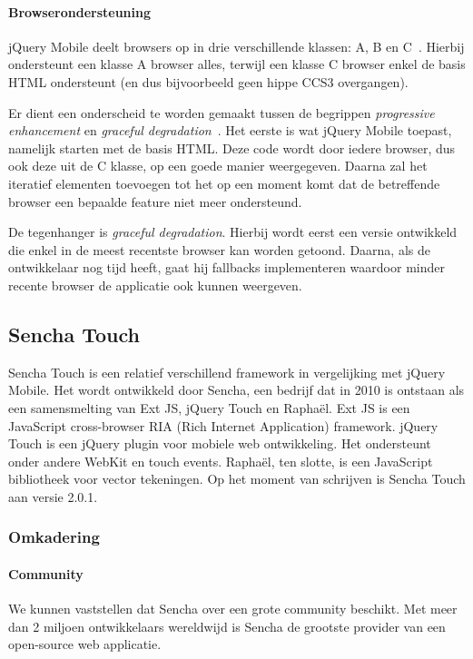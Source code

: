\paragraph{Browserondersteuning}
\label{sec:jqm-browser-support}
jQuery Mobile deelt browsers op in drie verschillende klassen: A, B en C~\cite{JQuery2012d}. Hierbij ondersteunt een klasse A browser alles, terwijl een klasse C browser enkel de basis HTML ondersteunt (en dus bijvoorbeeld geen hippe CCS3 overgangen).

Er dient een onderscheid te worden gemaakt tussen de begrippen \emph{progressive enhancement} en \emph{graceful degradation}~\cite{Hens2012}. Het eerste is wat jQuery Mobile toepast, namelijk starten met de basis HTML. Deze code wordt door iedere browser, dus ook deze uit de C klasse, op een goede manier weergegeven. Daarna zal het iteratief elementen toevoegen tot het op een moment komt dat de betreffende browser een bepaalde feature niet meer ondersteund.

De tegenhanger is \emph{graceful degradation}. Hierbij wordt eerst een versie ontwikkeld die enkel in de meest recentste browser kan worden getoond. Daarna, als de ontwikkelaar nog tijd heeft, gaat hij fallbacks implementeren waardoor minder recente browser de applicatie ook kunnen weergeven.


\subsection{Sencha Touch}

Sencha Touch is een relatief verschillend framework in vergelijking met jQuery Mobile.  Het wordt ontwikkeld door Sencha,  een bedrijf dat in 2010 is ontstaan als een samensmelting van Ext JS,  jQuery Touch en Raphaël.  Ext JS is een JavaScript cross-browser RIA (Rich Internet Application) framework. jQuery Touch is een jQuery plugin voor mobiele web ontwikkeling.  Het ondersteunt onder andere WebKit en touch events.  Raphaël,  ten slotte,  is een JavaScript bibliotheek voor vector tekeningen. Op het moment van schrijven is Sencha Touch aan versie 2.0.1.  

\subsubsection{Omkadering}
\paragraph{Community}
We kunnen vaststellen dat Sencha over een grote community beschikt.  Met meer dan 2 miljoen ontwikkelaars wereldwijd is Sencha de grootste provider van een open-source web applicatie.  


